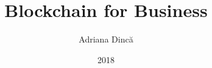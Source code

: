 \title{Blockchain for Business}
\author{Adriana Dincă}
\date{2018}



\newcommand{\project}{Envision Blockchain for your Business}

